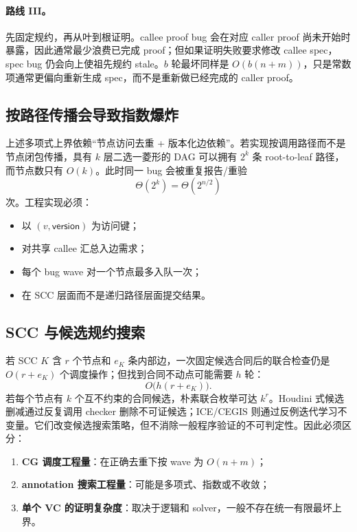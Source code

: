\documentclass[UTF8,a4paper,11pt]{ctexart}
\begin{document}
\paragraph{路线 III。}
先固定规约，再从叶到根证明。callee proof bug 会在对应 caller proof 尚未开始时暴露，因此通常最少浪费已完成 proof；但如果证明失败要求修改 callee spec，spec bug 仍会向上使祖先规约 stale。$b$ 轮最坏同样是 $O(b(n+m))$，只是常数项通常更偏向重新生成 spec，而不是重新做已经完成的 caller proof。

\subsection{按路径传播会导致指数爆炸}

上述多项式上界依赖“节点访问去重 + 版本化边依赖”。若实现按调用路径而不是节点闭包传播，具有 $k$ 层二选一菱形的 DAG 可以拥有 $2^k$ 条 root-to-leaf 路径，而节点数只有 $O(k)$。此时同一 bug 会被重复报告/重验
\[
  \Theta(2^k)=\Theta(2^{n/2})
\]
次。工程实现必须：
\begin{itemize}
  \item 以 $(v,\mathsf{version})$ 为访问键；
  \item 对共享 callee 汇总入边需求；
  \item 每个 bug wave 对一个节点最多入队一次；
  \item 在 SCC 层面而不是递归路径层面提交结果。
\end{itemize}

\subsection{SCC 与候选规约搜索}

若 SCC $K$ 含 $r$ 个节点和 $e_K$ 条内部边，一次固定候选合同后的联合检查仍是 $O(r+e_K)$ 个调度操作；但找到合同不动点可能需要 $h$ 轮：
\[
  O\bigl(h(r+e_K)\bigr).
\]
若每个节点有 $k$ 个互不约束的合同候选，朴素联合枚举可达 $k^r$。Houdini 式候选删减通过反复调用 checker 删除不可证候选\cite{Flanagan2001Houdini}；ICE/CEGIS 则通过反例迭代学习不变量\cite{Garg2014ICE}。它们改变候选搜索策略，但不消除一般程序验证的不可判定性。因此必须区分：
\begin{enumerate}
  \item \textbf{CG 调度工程量}：在正确去重下按 wave 为 $O(n+m)$；
  \item \textbf{annotation 搜索工程量}：可能是多项式、指数或不收敛；
  \item \textbf{单个 VC 的证明复杂度}：取决于逻辑和 solver，一般不存在统一有限最坏上界。
\end{enumerate}
\end{document}
